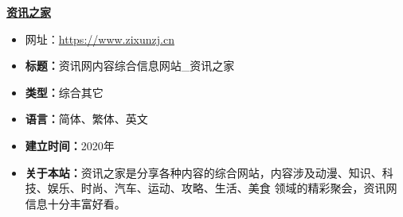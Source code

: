 \textbf{\href{https://www.zixunzj.cn}{资讯之家}}
\begin{itemize}
\item 网址：\href{https://www.zixunzj.cn}{https://www.zixunzj.cn}
\item \textbf{标题：}资讯网内容综合信息网站_资讯之家
\item \textbf{类型：}综合其它
\item \textbf{ 语言：}简体、繁体、英文
\item \textbf{建立时间：}2020年
\item \textbf{关于本站：}资讯之家是分享各种内容的综合网站，内容涉及动漫、知识、科技、娱乐、时尚、汽车、运动、攻略、生活、美食 领域的精彩聚会，资讯网信息十分丰富好看。
\end{itemize}